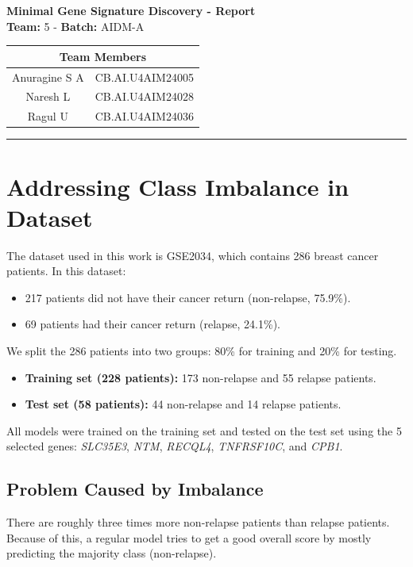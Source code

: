 \documentclass[11pt,a4paper]{article}
\begin{document}
\begin{center}
    {\LARGE \textbf{Minimal Gene Signature Discovery - Report}}\\[0.6em]
    \textbf{Team:} 5 - \textbf{Batch:} AIDM-A\\[1.0em]
    
    {\renewcommand{\arraystretch}{1.35}%
    \setlength{\tabcolsep}{18pt}%
    \begin{tabular}{|c|c|}
        \hline
        \multicolumn{2}{|c|}{\textbf{Team Members}} \\
        \hline
        Anuragine S A & CB.AI.U4AIM24005 \\
        \hline
        Naresh L & CB.AI.U4AIM24028 \\
        \hline
        Ragul U & CB.AI.U4AIM24036 \\
        \hline
    \end{tabular}}
\end{center}
\vspace{1.8em}
\hrule
\vspace{1.0em}

\section{Addressing Class Imbalance in Dataset}

The dataset used in this work is GSE2034, which contains 286 breast cancer patients. In this dataset:
\begin{itemize}
    \item 217 patients did not have their cancer return (non-relapse, 75.9\%).
    \item 69 patients had their cancer return (relapse, 24.1\%).
\end{itemize}
We split the 286 patients into two groups: 80\% for training and 20\% for testing. 
\begin{itemize}
    \item \textbf{Training set (228 patients):} 173 non-relapse and 55 relapse patients.
    \item \textbf{Test set (58 patients):} 44 non-relapse and 14 relapse patients.
\end{itemize}
All models were trained on the training set and tested on the test set using the 5 selected genes: \textit{SLC35E3}, \textit{NTM}, \textit{RECQL4}, \textit{TNFRSF10C}, and \textit{CPB1}.

\subsection{Problem Caused by Imbalance}
There are roughly three times more non-relapse patients than relapse patients. Because of this, a regular model tries to get a good overall score by mostly predicting the majority class (non-relapse).
\end{document}
